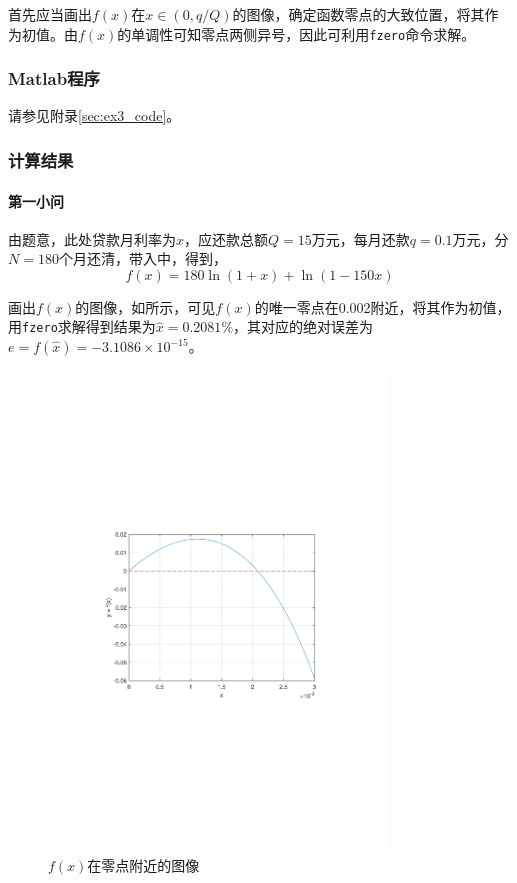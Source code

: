\documentclass[12pt,a4paper]{article}
\begin{document}
首先应当画出$f(x)$在$x\in (0, q/Q)$的图像，确定函数零点的大致位置，将其作为初值。由$f(x)$的单调性可知零点两侧异号，因此可利用\texttt{fzero}命令求解。

\subsubsection{Matlab程序}

请参见附录\ref{sec:ex3_code}。

\subsubsection{计算结果}

\paragraph{第一小问} 由题意，此处贷款月利率为$x$，应还款总额$Q=15$万元，每月还款$q=0.1$万元，分$N=180$个月还清，带入中，得到，
\begin{equation}
    f(x) = 180 \ln (1+x) + \ln (1-150x)
\end{equation}

画出$f(x)$的图像，如所示，可见$f(x)$的唯一零点在0.002附近，将其作为初值，用\texttt{fzero}求解得到结果为$\hat{x}=0.2081\%$，其对应的绝对误差为$e=f(\hat{x})=-3.1086\times 10^{-15}$。

\begin{figure}[t]
    \centering
    \includegraphics[width=0.8\textwidth,trim={3.09cm 9.295cm 3.09cm 9.295cm},clip]{fig/ex3_1_graph.pdf}
    \caption{$f(x)$在零点附近的图像}
    \label{fig:ex3_1_graph}
\end{figure}
\end{document}
